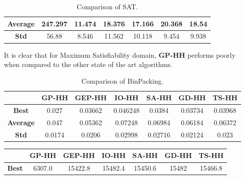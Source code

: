\documentclass[a4paper,12pt]{article}
\begin{document}
{\begin{table}[ht]
\begin{tabular}{| c | c | c | c | c| c| c|}
                    \hline
                    \textbf{Average} & 247.297 & 11.474& 18.376& 17.166& 20.368&18.54\\
                    \hline
                    \textbf{Std} & 56.88 & 8.546& 11.562& 10.118& 9.454&9.938\\
                    \hline
                \end{tabular}
                \caption{Comparison of SAT.} 
        \end{table}
        \newline 
        It is clear that for Maximum Satisfiability domain, \textbf{GP-HH} performs poorly when compared to the other state of the art
        algorithms.
        \begin{table}[ht] 
                \small 
                \centering
                \begin{tabular}{| c | c | c | c | c| c| c|} 
                    \hline   
                    &\textbf{GP-HH} & \textbf{GEP-HH} & \textbf{IO-HH} & \textbf{SA-HH} & \textbf{GD-HH} & \textbf{TS-HH} \\
                    \hline
                    \textbf{Best}  & 0.027 &0.03662 & 0.046248& 0.0384& 0.03734&0.03968\\
                    \hline
                    \textbf{Average} & 0.047 & 0.05362& 0.07248& 0.06984& 0.06184&0.06372\\
                    \hline
                    \textbf{Std} & 0.0174 & 0.0206& 0.02998& 0.02716& 0.02124&0.023\\
                    \hline
                \end{tabular}
                \caption{Comparison of BinPacking.} 
        \end{table}
        \begin{table}[ht] 
                \small 
                \centering
                \begin{tabular}{| c | c | c | c | c| c| c|} 
                    \hline   
                    &\textbf{GP-HH} & \textbf{GEP-HH} & \textbf{IO-HH} & \textbf{SA-HH} & \textbf{GD-HH} & \textbf{TS-HH} \\
                    \hline
                    \textbf{Best} &  6307.0 &15422.8& 15482.4& 15450.6& 15482& 15466.8\\

\end{tabular}
\end{table}}
\end{document}
